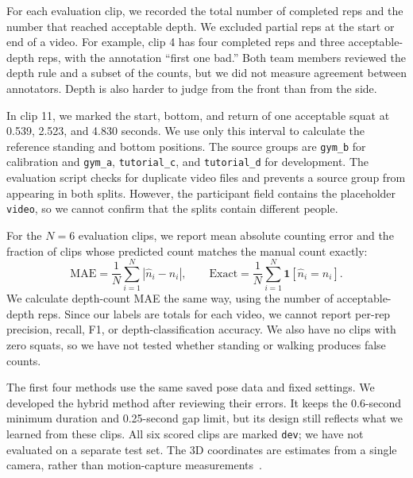 \documentclass[10pt,letterpaper]{article}
\newcommand{\reportassets}{}
\renewcommand{\reportassets}{../../data/reports/midpoint/}%
\renewcommand{\reportassets}{data/reports/midpoint/}%
\begin{document}
\begin{center}

\end{center}

For each evaluation clip, we recorded the total number of completed reps and
the number that reached acceptable depth. We excluded partial reps at the
start or end of a video. For example, clip 4 has four completed reps and three
acceptable-depth reps, with the annotation ``first one bad.'' Both team members
reviewed the depth rule and a subset of the counts, but we did not measure
agreement between annotators. Depth is also harder to judge from the front
than from the side.

In clip 11, we marked the start, bottom, and return of one acceptable squat
at 0.539, 2.523, and 4.830 seconds. We use only this interval to calculate the
reference standing and bottom positions. The source groups are
\texttt{gym\_b} for calibration and \texttt{gym\_a}, \texttt{tutorial\_c}, and
\texttt{tutorial\_d} for development. The evaluation script checks for duplicate
video files and prevents a source group from appearing in both splits.
However, the participant field contains the placeholder \texttt{video}, so we
cannot confirm that the splits contain different people.

For the $N=6$ evaluation clips, we report mean absolute counting error and the
fraction of clips whose predicted count matches the manual count exactly:
\[
\mathrm{MAE}=\frac{1}{N}\sum_{i=1}^{N}|\widehat n_i-n_i|,
\qquad
\mathrm{Exact}=\frac{1}{N}\sum_{i=1}^{N}\mathbf{1}[\widehat n_i=n_i].
\]
We calculate depth-count MAE the same way, using the number of acceptable-depth
reps. Since our labels are totals for each video, we cannot report per-rep
precision, recall, F1, or depth-classification accuracy. We also have no clips
with zero squats, so we have not tested whether standing or walking produces
false counts.

The first four methods use the same saved pose data and fixed settings.
We developed the hybrid method after reviewing their errors. It keeps the
0.6-second minimum duration and 0.25-second gap limit, but its design still
reflects what we learned from these clips. All six scored clips are marked
\texttt{dev}; we have not evaluated on a separate test set. The 3D coordinates
are estimates from a single camera, rather than motion-capture
measurements~\cite{mediapipe}.
\end{document}
